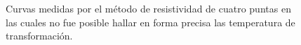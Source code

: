 \documentclass[12pt]{article}
\theoremstyle{definition}
\theoremstyle{remark}
\begin{document}
{\begin{figure}[H]
\centering
{} \\
\\
\caption{Curvas medidas por el método de resistividad de cuatro puntas en las cuales no fue posible hallar en forma precisa las temperatura de transformación.}
\label{Failures}
\end{figure}


}
\end{document}
